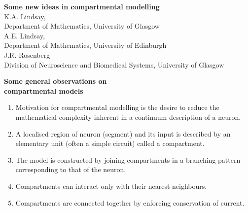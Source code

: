 \documentclass{slides}
\begin{document}

%
%
\begin{slide}
\begin{center}
{\bf Some new ideas in compartmental modelling}\\[60pt]
K.A. Lindsay, \\
Department of Mathematics, University of Glasgow\\[40pt]
A.E. Lindsay, \\
Department of Mathematics, University of Edinburgh\\[40pt]
J.R. Rosenberg \\
Division of Neuroscience and Biomedical Systems,
University of Glasgow
\end{center}
\end{slide}

%
%
\begin{slide}
\begin{center}
\textbf{Some general observations on \\ compartmental models}
\end{center}
\begin{enumerate}
\item
Motivation for compartmental modelling is the desire to reduce the
mathematical complexity inherent in a continuum description of a
neuron.

\item
A localised region of neuron (segment) and its input is described
by an elementary unit (often a simple circuit) called a compartment.

\item
The model is constructed by joining compartments in a
branching pattern corresponding to that of the neuron.

\item
Compartments can interact only with their nearest
neighbours.

\item
Compartments are connected together by enforcing conservation of current.
\end{enumerate}
\end{slide}
\end{document}
